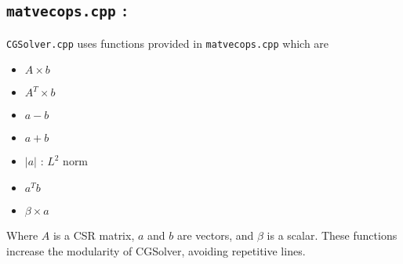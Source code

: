 \documentclass[10pt]{article}
\begin{document}
\subsection*{\texttt{matvecops.cpp} :}
\texttt{CGSolver.cpp} uses functions provided in \texttt{matvecops.cpp} which are \begin{itemize}
    \item $A\times b$ 
    \item $A^T\times b$
    \item $a - b$
    \item $a + b$
    \item $|a|$ : $L^2$ norm
    \item $a^Tb$
    \item $\beta \times a$
\end{itemize}
Where $A$ is a CSR matrix, $a$ and $b $ are vectors, and $\beta$ is a scalar. These functions increase the modularity of CGSolver, avoiding repetitive lines. 
\end{document}
